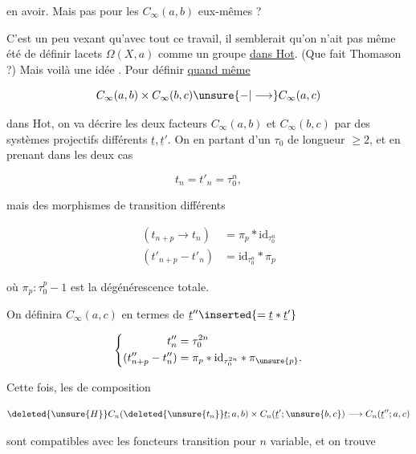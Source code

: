 
en avoir.  Mais pas pour les $C_\infty(a,b)$ eux-mêmes ?

C'est un peu vexant qu'avec tout ce travail, il semblerait qu'on n'ait pas même été  de définir    lacets $\Omega(X,a)$ comme un groupe \uline{dans Hot}. (Que fait Thomason ?) Mais voilà une idée . Pour définir \uline{quand même}

\[
C_\infty(a,b)\times C_\infty(b,c)\unsure{-|\longrightarrow} C_\infty(a,c)
\]

dans $\mathrm{Hot}$, on va décrire les deux facteurs $C_\infty(a,b)$ et $C_\infty(b,c)$ par des systèmes projectifs différents $\underline t,\underline t'$. On   en partant d'un $\tau_0$ de longueur  $\geq2$, et en prenant dans les deux cas

\[
t_n=t'_n=\tau_0^n,
\]

mais des morphismes de transition différents

\[
\begin{aligned}
(t_{n+p}\longrightarrow t_n)&=\pi_p*\mathrm{id}_{\tau_0^n}\\
(t'_{n+p}-t'_n)&=\mathrm{id}_{\tau_0^n}*\pi_p
\end{aligned}
\]

où $\pi_p:\tau_0^p-1$ est la  dégénérescence totale.

On  définira $C_\infty(a,c)$ en termes de $\underline t''\inserted{=\underline t*\underline t'}$

\[
\left\{\begin{aligned}
t''_n&=\tau_0^{2n}\\
(t''_{n+p}-t''_n)&=\pi_p*\mathrm{id}_{\tau_0^{2n}}*\pi_{\unsure{p}}.
\end{aligned}\right.
\]

Cette fois, les   de composition

\[
\deleted{\unsure{H}}C_n(\deleted{\unsure{t_n}}\underline t;a,b)\times C_n(\underline t';\unsure{b,c})\longrightarrow C_n(\underline t'';a,c)
\]

sont compatibles avec les foncteurs transition pour $n$ variable, et on trouve

